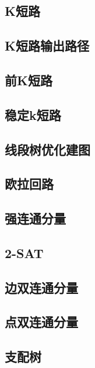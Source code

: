 \documentclass{article}
\begin{document}
\subsection{K短路} 

\subsection{K短路输出路径} 

\subsection{前K短路} 

\subsection{稳定k短路} 

\subsection{线段树优化建图} 


\subsection{欧拉回路} 


\subsection{强连通分量} 

\subsection{2-SAT} 

\subsection{边双连通分量} 

\subsection{点双连通分量} 

\subsection{支配树} 

\end{document}
